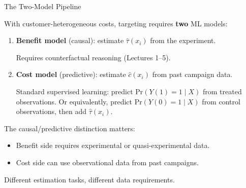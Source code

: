 \documentclass[aspectratio=169, 11pt, handout]{beamer}
\newcommand{\Prob}{\mathrm{Pr}}
\begin{document}
 
 
\begin{frame}{The Two-Model Pipeline}
 
With customer-heterogeneous costs, targeting requires \textbf{two} ML models:
 
\bigskip
 
\begin{enumerate}
    \item \textbf{Benefit model} (causal): estimate $\hat{\tau}(x_i)$ from the experiment.
    
    Requires counterfactual reasoning (Lectures 1--5).
    
    \medskip
    
    \item \textbf{Cost model} (predictive): estimate $\hat{c}(x_i)$ from past campaign data.
    
    Standard supervised learning: predict $\Prob(Y(1)\!=\!1 \mid X)$ from treated observations. Or equivalently, predict $\Prob(Y(0)\!=\!1 \mid X)$ from control observations, then add $\hat{\tau}(x_i)$.
\end{enumerate}
 
\pause
\bigskip
 
The causal/predictive distinction matters:
\begin{itemize}
    \item Benefit side requires experimental or quasi-experimental data.
    \item Cost side can use observational data from past campaigns.
\end{itemize}
 
\pause
\bigskip
 
Different estimation tasks, different data requirements.
 
\end{frame}
 
\end{document}
